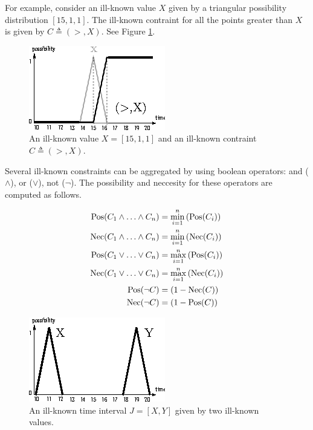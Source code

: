 For example, consider an ill-known value $X$ given by a triangular possibility distribution $\left[15, 1, 1\right]$. The ill-known contraint for all the points greater than $X$ is given by $C \triangleq (>, X)$. See Figure \ref{fig:ikc-greater}.
 
\begin{figure}[h]
   \centering
   \includegraphics[scale=1.5]{graphs/gt.eps}
   \caption{An ill-known value $X = \left[15, 1, 1\right]$ and an ill-known contraint $C \triangleq (>, X)$. }
   \label{fig:ikc-greater}
 \end{figure}


Several ill-known constraints can be aggregated by using boolean operators: and ($\wedge$), or ($\vee$), not ($\neg$). The possibility and neccesity for these operators are computed as follows. 

\begin{align}
\operatorname{Pos}(C_1 \wedge \ldots \wedge C_n) & = \min_{i= 1}^{n} \left(\operatorname{Pos}(C_i)\right) \label{and-ill-known-pos}\\
\operatorname{Nec}(C_1 \wedge \ldots \wedge C_n) & = \min_{i= 1}^{n} \left( \operatorname{Nec}(C_i )\right) \label{and-ill-known-nec}\\
\operatorname{Pos}(C_1 \vee \ldots \vee C_n) & = \max_{i= 1}^{n} \left(\operatorname{Pos}(C_i)\right) \label{or-ill-known-pos}\\
\operatorname{Nec}(C_1 \vee \ldots \vee C_n) & = \max_{i= 1}^{n} \left( \operatorname{Nec}(C_i )\right) \label{or-ill-known-nec}\\
\operatorname{Pos}( \neg C) & =  \left(1-\operatorname{Nec}(C)\right) \label{not-ill-known-pos}\\
\operatorname{Nec}(\neg C) & = \left(1- \operatorname{Pos}(C)\right) \label{not-ill-known-nec}
\end{align}


 \begin{figure}[h]
   \centering
   \includegraphics[scale=1.5]{graphs/ill-known-ti.eps}
   \caption{An ill-known time interval $J = \left[X, Y  \right]$ given by two ill-known values. }
   \label{fig:ill-known-ti}
 \end{figure}


